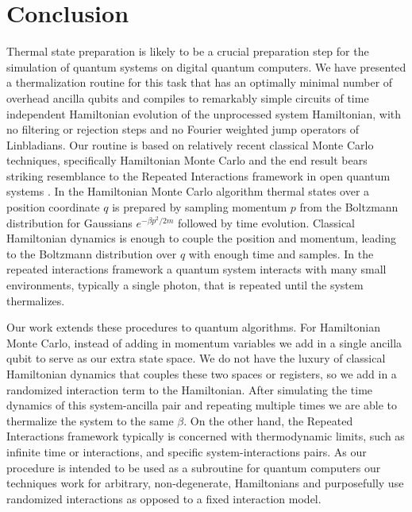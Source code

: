 \section{Conclusion} \label{sec:conclusion}

Thermal state preparation is likely to be a crucial preparation step for the simulation of quantum systems on digital quantum computers. We have presented a thermalization routine for this task that has an optimally minimal number of overhead ancilla qubits and compiles to remarkably simple circuits of time independent Hamiltonian evolution of the unprocessed system Hamiltonian, with no filtering or rejection steps and no Fourier weighted jump operators of Linbladians. Our routine is based on relatively recent classical Monte Carlo techniques, specifically Hamiltonian Monte Carlo \cite{hoffman2011nouturnsampleradaptivelysetting} and the end result bears striking resemblance to the Repeated Interactions framework in open quantum systems \cite{prositto2025equilibrium}. In the Hamiltonian Monte Carlo algorithm thermal states over a position coordinate $q$ is prepared by sampling momentum $p$ from the Boltzmann distribution for Gaussians $e^{-\beta p^2/2m}$ followed by time evolution. Classical Hamiltonian dynamics is enough to couple the position and momentum, leading to the Boltzmann distribution over $q$ with enough time and samples. In the repeated interactions framework a quantum system interacts with many small environments, typically a single photon, that is repeated until the system thermalizes. 

Our work extends these procedures to quantum algorithms. For Hamiltonian Monte Carlo, instead of adding in momentum variables we add in a single ancilla qubit to serve as our extra state space. We do not have the luxury of classical Hamiltonian dynamics that couples these two spaces or registers, so we add in a randomized interaction term to the Hamiltonian. After simulating the time dynamics of this system-ancilla pair and repeating multiple times we are able to thermalize the system to the same $\beta$. On the other hand, the Repeated Interactions framework typically is concerned with thermodynamic limits, such as infinite time or interactions, and specific system-interactions pairs. As our procedure is intended to be used as a subroutine for quantum computers our techniques work for arbitrary, non-degenerate, Hamiltonians and purposefully use randomized interactions as opposed to a fixed interaction model.

